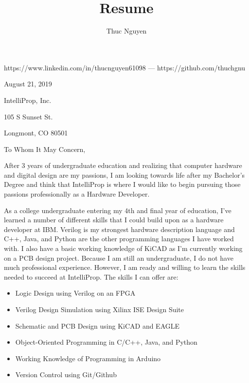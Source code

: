 \documentclass{article}
\renewcommand{\maketitle}
{\begin{center}
{\huge\bfseries\theauthor}
\vspace{.5em}

https://www.linkedin.com/in/thucnguyen61098 --- https://github.com/thuchgnu

\end{center}}
\begin{document}
\title{Resume}
\author{Thuc Nguyen}
\maketitle
\vspace{-.5em}

\begin{flushleft}
\vspace{1.6em}

August 21, 2019

\vspace{1.6em}
IntelliProp, Inc.

105 S Sunset St.

Longmont, CO 80501

\end{flushleft}
\vspace{1.6em}
To Whom It May Concern,

\vspace{1em}
After 3 years of undergraduate education and realizing that computer hardware and digital design are my passions, I am looking towards life after my Bachelor's Degree and think that IntelliProp is where I would like to begin pursuing those passions professionally as a Hardware Developer.

\vspace{.6em}
As a college undergraduate entering my 4th and final year of education, I've learned a number of different skills that I could build upon as a hardware developer at IBM. Verilog is my strongest hardware description language and C++, Java, and Python are the other programming languages I have worked with. I also have a basic working knowledge of KiCAD as I'm currently working on a PCB design project. Because I am still an undergraduate, I do not have much professional experience. However, I am ready and willing to learn the skills needed to succeed at IntelliProp. The skills I can offer are:

\begin{itemize}
  \item{Logic Design using Verilog on an FPGA}
  \item{Verilog Design Simulation using Xilinx ISE Design Suite}
  \item{Schematic and PCB Design using KiCAD and EAGLE}
  \item{Object-Oriented Programming in C/C++, Java, and Python}
  \item{Working Knowledge of Programming in Arduino}
  \item{Version Control using Git/Github}
\end{itemize}
\end{document}
